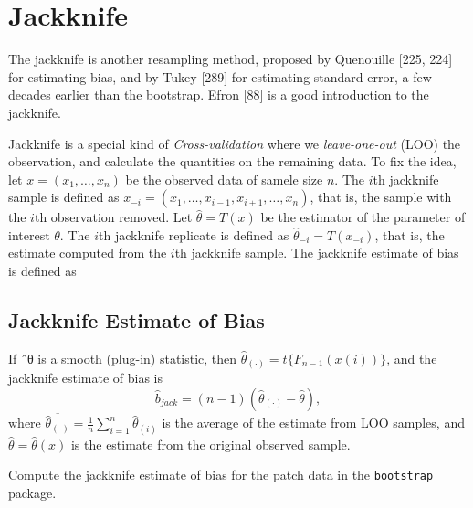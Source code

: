 \documentclass[
  letterpaper,
  DIV=11,
  numbers=noendperiod]{scrreprt}
\newenvironment{Shaded}{\begin{snugshade}}{\end{snugshade}}
\newcommand{\AttributeTok}[1]{\textcolor[rgb]{0.40,0.45,0.13}{#1}}
\newcommand{\FunctionTok}[1]{\textcolor[rgb]{0.28,0.35,0.67}{#1}}
\newcommand{\NormalTok}[1]{\textcolor[rgb]{0.00,0.23,0.31}{#1}}
\newcommand{\OtherTok}[1]{\textcolor[rgb]{0.00,0.23,0.31}{#1}}
\newcommand{\SpecialCharTok}[1]{\textcolor[rgb]{0.37,0.37,0.37}{#1}}
\newcommand{\StringTok}[1]{\textcolor[rgb]{0.13,0.47,0.30}{#1}}
\begin{document}
\section{Jackknife}\label{jackknife-1}

The jackknife is another resampling method, proposed by Quenouille
{[}225, 224{]} for estimating bias, and by Tukey {[}289{]} for
estimating standard error, a few decades earlier than the bootstrap.
Efron {[}88{]} is a good introduction to the jackknife.

Jackknife is a special kind of \emph{Cross-validation} where we
\emph{leave-one-out} (LOO) the observation, and calculate the quantities
on the remaining data. To fix the idea, let \(x=(x_1,\dots,x_n)\) be the
observed data of samele size \(n\). The \(i\)th jackknife sample is
defined as \(x_{-i}=(x_1,\dots,x_{i-1},x_{i+1},\dots,x_n)\), that is,
the sample with the \(i\)th observation removed. Let
\(\hat{\theta}=T(x)\) be the estimator of the parameter of interest
\(\theta\). The \(i\)th jackknife replicate is defined as
\(\hat{\theta}_{-i}=T(x_{-i})\), that is, the estimate computed from the
\(i\)th jackknife sample. The jackknife estimate of bias is defined as

\subsection{Jackknife Estimate of
Bias}\label{jackknife-estimate-of-bias}

If ˆθ is a smooth (plug-in) statistic, then
\(\hat{\theta}_{(\cdot)} = t\{F_{n−1}(x(i))\}\), and the jackknife
estimate of bias is \[
\hat{b}_{jack} = (n − 1)(\hat{\theta}_{(\cdot)} − \hat{\theta}), 
\] where
\(\overline{\hat{\theta}_{(\cdot)}}=\frac{1}{n} \sum_{i=1}^n \hat{\theta}_{(i)}\)
is the average of the estimate from LOO samples, and
\(\hat{\theta}=\hat{\theta}(x)\) is the estimate from the original
observed sample.

Compute the jackknife estimate of bias for the patch data in the
\texttt{bootstrap} package.

\begin{Shaded}
\end{Shaded}
\end{document}
